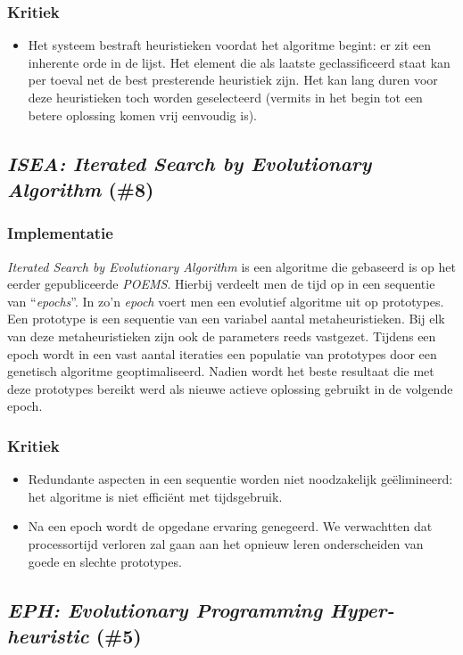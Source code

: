 \subsubsection{Kritiek}
\begin{itemize}
 \item Het systeem bestraft heuristieken voordat het algoritme begint: er zit een inherente orde in de lijst. Het element die als laatste geclassificeerd staat kan per toeval net de best presterende heuristiek zijn. Het kan lang duren voor deze heuristieken toch worden geselecteerd (vermits in het begin tot een betere oplossing komen vrij eenvoudig is).
\end{itemize}
\subsection{\emph{ISEA: Iterated Search by Evolutionary Algorithm} (\#8)}
\label{sss:isea}
\subsubsection{Implementatie}
\emph{Iterated Search by Evolutionary Algorithm}\cite{chesc-isea} is een algoritme die gebaseerd is op het eerder gepubliceerde \emph{POEMS}\cite{eurogp06:KubalikFaigl}. Hierbij verdeelt men de tijd op in een sequentie van ``\emph{epochs}''. In zo'n \emph{epoch} voert men een evolutief algoritme uit op prototypes. Een prototype is een sequentie van een variabel aantal metaheuristieken. Bij elk van deze metaheuristieken zijn ook de parameters reeds vastgezet. Tijdens een epoch wordt in een vast aantal iteraties een populatie van prototypes door een genetisch algoritme geoptimaliseerd. Nadien wordt het beste resultaat die met deze prototypes bereikt werd als nieuwe actieve oplossing gebruikt in de volgende epoch. 
\subsubsection{Kritiek}
\begin{itemize}
 \item Redundante aspecten in een sequentie worden niet noodzakelijk ge\"elimineerd: het algoritme is niet effici\"ent met tijdsgebruik.
 \item Na een epoch wordt de opgedane ervaring genegeerd. We verwachtten dat processortijd verloren zal gaan aan het opnieuw leren onderscheiden van goede en slechte prototypes.
\end{itemize}
\subsection{\emph{EPH: Evolutionary Programming Hyper-heuristic} (\#5)}
\label{sss:eph}
